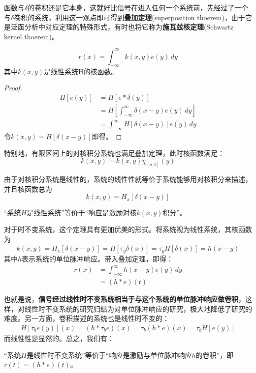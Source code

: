 函数与$\delta$的卷积还是它本身，这就好比信号在进入任何一个系统前，先经过了一个与$\delta$卷积的系统，利用这一观点即可得到\textbf{叠加定理}(superposition thoerem)\cite{brad_osgood_ee261}，由于它是泛函分析中对应定理的特殊形式，有时也将它称为\textbf{施瓦兹核定理}(Schwartz kernel thoerem)。
\begin{theorem}
    \begin{equation*}
        r(x)=\int_{-\infty}^{\infty}k(x,y)e(y)\,dy
    \end{equation*}
其中$k(x,y)$是线性系统H的核函数。
\end{theorem}
\begin{proof}\begin{align*}
    H[e(y)]&=H[e*\delta(y)]\\
    &=H\left[\int_{-\infty}^{\infty}\delta(x-y)e(y)\,dy\right]\\
    &=\int_{-\infty}^{\infty}H[\delta(x-y)]e(y)\,dy
\end{align*}
令$k(x,y)=H[\delta(x-y)]$即得。
\end{proof}

特别地，有限区间上的对核积分系统也满足叠加定理，此时核函数满足：
\[k(x,y)=k(x,y)\chi_{[a,b]}(y)\]

由于对核积分系统是线性的，系统的线性性就等价于系统能够用对核积分来描述，并且核函数总为
$$k(x,y)=H_x[\delta(x-y)]$$

\begin{proposition}[线性系统的等价定义]
    “系统$H$是线性系统”等价于“响应是激励对核$k(x,y)$积分”。
\end{proposition}

对于时不变系统，这个定理具有更加优美的形式。将系统视为线性系统，其核函数为
\[k(x,y)=H_x[\delta(x-y)]=H[\tau_y\delta(x)]=\tau_y H[\delta(x)]=h(x-y)\]
其中$h$表示系统的单位脉冲响应。带入叠加定理，即得：
\begin{align*}
    r(x)&=\int_{-\infty}^{\infty}h(x-y)e(y)\,dy\\
    &=(h*e)(t)
\end{align*}

也就是说，\textbf{信号经过线性时不变系统相当于与这个系统的单位脉冲响应做卷积}，这样，对线性时不变系统的研究归结为对单位脉冲响应的研究，极大地降低了研究的难度。另一方面，卷积描述的系统也是线性时不变的：\begin{align*}
    H[\tau_b e(y)](x)=(h*\tau_b e)(x)=\tau_b(h*e)(x)=\tau_b H[e(y)]
\end{align*}
而线性性是显然的。总之，我们有：
\begin{proposition}[线性时不变系统的等价定义]
    “系统$H$是线性时不变系统”等价于“响应是激励与单位脉冲响应$h$的卷积”，即$r(t)=(h*e)(t)$。
\end{proposition}

